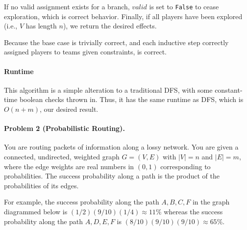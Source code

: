 \documentclass[11pt]{article}
\begin{document}
If no valid assignment exists for a branch, $valid$ is set to \texttt{False} to
cease exploration, which is correct behavior. Finally, if all players have
been explored (i.e., $V$ has length $n$), we return the desired effects.

Because the base case is trivially correct, and each inductive step correctly
assigned players to teams given constraints,  is correct.

\paragraph{Runtime}
This algorithm is a simple alteration to a traditional DFS, with some 
constant-time boolean checks thrown in. Thus, it has the same runtime as
DFS, which is $O(n+m)$, our desired result.

\newpage
\paragraph{Problem 2 (Probabilistic Routing).} You are routing packets of information along a lossy network. You are given a connected, undirected, weighted graph $G = (V, E)$ with $|V| = n$ and $|E| = m$, where the edge weights are real numbers in $(0, 1)$ corresponding to probabilities. The success probability along a path is the product of the probabilities of its edges.  

For example, the success probability along the path $A, B, C, F$ in the graph diagrammed below is $(1/2)(9/10)(1/4) \approx 11\%$ whereas the success probability along the path $A, D, E, F$ is $(8/10)(9/10)(9/10) \approx 65\%$.

\begin{figure}[!h]
\centering
{}
\end{figure}
\end{document}
